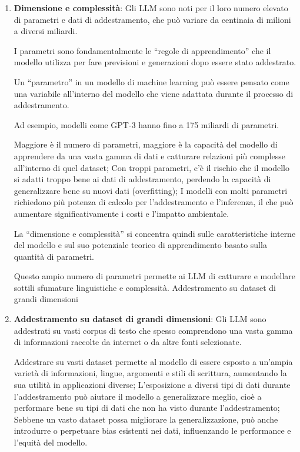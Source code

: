             \begin{enumerate}
                \item
                    \textbf{Dimensione e complessità}: Gli LLM sono noti per il loro numero elevato di parametri e dati di addestramento, che può variare da centinaia di milioni a diversi miliardi.  
            
                    I parametri sono fondamentalmente le ``regole di apprendimento'' che il modello utilizza per fare previsioni e generazioni dopo essere stato addestrato.  
                    
                    Un ``parametro'' in un modello di machine learning può essere pensato come una variabile all'interno del modello che viene adattata durante il processo di addestramento.  
                    
                    Ad esempio, modelli come GPT-3 hanno fino a 175 miliardi di parametri.  
                    
                    Maggiore è il numero di parametri, maggiore è la capacità del modello di apprendere da una vasta gamma di dati e catturare relazioni più complesse all'interno di quel dataset; Con troppi parametri, c'è il rischio che il modello si adatti troppo bene ai dati di addestramento, perdendo la capacità di generalizzare bene su nuovi dati (overfitting); I modelli con molti parametri richiedono più potenza di calcolo per l'addestramento e l'inferenza, il che può aumentare significativamente i costi e l'impatto ambientale.  
                    
                    La ``dimensione e complessità'' si concentra quindi sulle caratteristiche interne del modello e sul suo potenziale teorico di apprendimento basato sulla quantità di parametri.  
                    
                    Questo ampio numero di parametri permette ai LLM di catturare e modellare sottili sfumature linguistiche e complessità. Addestramento su dataset di grandi dimensioni
                
                \item
                    \textbf{Addestramento su dataset di grandi dimensioni}: Gli LLM sono addestrati su vasti corpus di testo che spesso comprendono una vasta gamma di informazioni raccolte da internet o da altre fonti selezionate. 
            
                    Addestrare su vasti dataset permette al modello di essere esposto a un'ampia varietà di informazioni, lingue, argomenti e stili di scrittura, aumentando la sua utilità in applicazioni diverse; L'esposizione a diversi tipi di dati durante l'addestramento può aiutare il modello a generalizzare meglio, cioè a performare bene su tipi di dati che non ha visto durante l'addestramento; Sebbene un vasto dataset possa migliorare la generalizzazione, può anche introdurre o perpetuare bias esistenti nei dati, influenzando le performance e l'equità del modello.  
                    

\end{enumerate}
